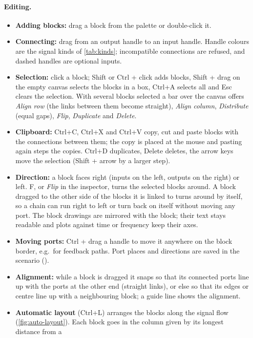 \paragraph{Editing.}
\begin{itemize}
  \item \textbf{Adding blocks:} drag a block from the palette or double-click it.
  \item \textbf{Connecting:} drag from an output handle to an input handle. Handle colours are
  the signal kinds of \cref{tab:kinds}; incompatible connections are refused, and dashed
  handles are optional inputs.
  \item \textbf{Selection:} click a block; Shift or Ctrl + click adds blocks, Shift + drag on
  the empty canvas selects the blocks in a box, Ctrl+A selects all and Esc clears the
  selection. With several blocks selected a bar over the canvas offers \emph{Align row} (the
  links between them become straight), \emph{Align column}, \emph{Distribute} (equal gaps),
  \emph{Flip}, \emph{Duplicate} and \emph{Delete}.
  \item \textbf{Clipboard:} Ctrl+C, Ctrl+X and Ctrl+V copy, cut and paste blocks with the
  connections between them; the copy is placed at the mouse and pasting again steps the
  copies. Ctrl+D duplicates, Delete deletes, the arrow keys move the selection (Shift + arrow
  by a larger step).
  \item \textbf{Direction:} a block faces right (inputs on the left, outputs on the right) or
  left. F, or \emph{Flip} in the inspector, turns the selected blocks around. A block dragged
  to the other side of the blocks it is linked to turns around by itself, so a chain can run
  right to left or turn back on itself without moving any port. The block drawings are
  mirrored with the block; their text stays readable and plots against time or frequency keep
  their axes.
  \item \textbf{Moving ports:} Ctrl + drag a handle to move it anywhere on the block border,
  e.g.\ for feedback paths. Port places and directions are saved in the scenario
  ().
  \item \textbf{Alignment:} while a block is dragged it snaps so that its connected ports line
  up with the ports at the other end (straight links), or else so that its edges or centre line
  up with a neighbouring block; a guide line shows the alignment.
  \item \textbf{Automatic layout} (Ctrl+L) arranges the blocks along the signal flow
  (\cref{fig:auto-layout}). Each block goes in the column given by its longest distance from a

\end{itemize}
